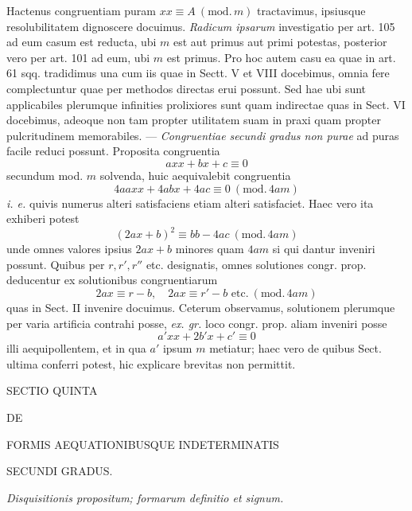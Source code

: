 Hactenus congruentiam puram $xx\equiv A\ (\mathrm{mod.}\,m)$ tractavimus, ipsiusque resolubilitatem dignoscere docuimus. \textit{Radicum ipsarum} investigatio per art. 105 ad eum casum est reducta, ubi $m$ est aut primus aut primi potestas, posterior vero per art. 101 ad eum, ubi $m$ est primus. Pro hoc autem casu ea quae in art. 61 sqq. tradidimus una cum iis quae in Sectt. V et VIII docebimus, omnia fere complectuntur quae per methodos directas erui possunt. Sed hae ubi sunt applicabiles plerumque infinities prolixiores sunt quam indirectae quas in Sect. VI docebimus, adeoque non tam propter utilitatem suam in praxi quam propter pulcritudinem memorabiles. --- \textit{Congruentiae secundi gradus non purae} ad puras facile reduci possunt. Proposita congruentia
\[
axx+bx+c\equiv 0
\]
secundum mod. $m$ solvenda, huic aequivalebit congruentia
\[
4aaxx+4abx+4ac\equiv 0\ (\mathrm{mod.}\,4am)
\]
\textit{i. e.} quivis numerus alteri satisfaciens etiam alteri satisfaciet. Haec vero ita exhiberi potest
\[
(2ax+b)^2\equiv bb-4ac\ (\mathrm{mod.}\,4am)
\]
unde omnes valores ipsius $2ax+b$ minores quam $4am$ si qui dantur inveniri possunt. Quibus per $r,r',r''$ etc. designatis, omnes solutiones congr. prop. deducentur ex solutionibus congruentiarum
\[
2ax\equiv r-b,\quad 2ax\equiv r'-b\text{ etc.}\ (\mathrm{mod.}\,4am)
\]
quas in Sect. II invenire docuimus. Ceterum observamus, solutionem plerumque per varia artificia contrahi posse, \textit{ex. gr.} loco congr. prop. aliam inveniri posse
\[
a'xx+2b'x+c'\equiv 0
\]
illi aequipollentem, et in qua $a'$ ipsum $m$ metiatur; haec vero de quibus Sect. ultima conferri potest, hic explicare brevitas non permittit.

\clearpage
{}
\begin{center}
SECTIO QUINTA

DE

FORMIS AEQUATIONIBUSQUE INDETERMINATIS

SECUNDI GRADUS.
\end{center}

\begin{center}
\textit{Disquisitionis propositum; formarum definitio et signum.}
\end{center}

